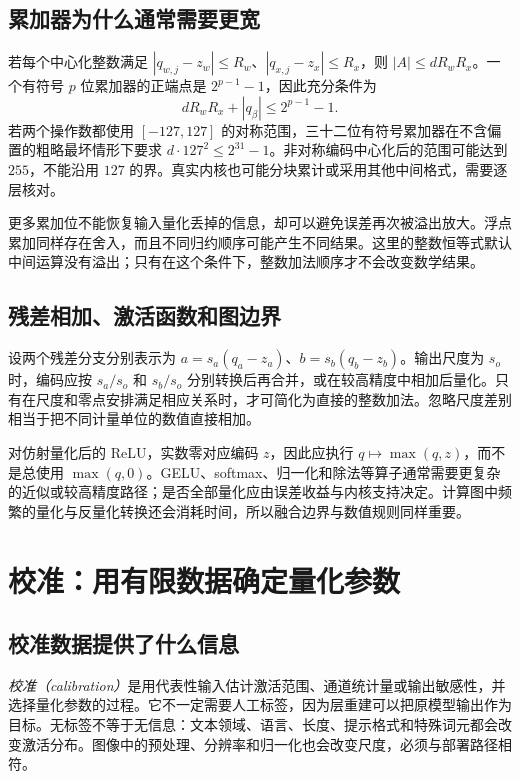 \documentclass[UTF8,12pt,a4paper,fontset=fandol]{ctexart}
\begin{document}
\subsection{累加器为什么通常需要更宽}
若每个中心化整数满足 $|q_{w,j}-z_w|\leq R_w$、$|q_{x,j}-z_x|\leq R_x$，则 $|A|\leq dR_wR_x$。一个有符号 $p$ 位累加器的正端点是 $2^{p-1}-1$，因此充分条件为
\begin{equation}
 dR_wR_x+|q_\beta|\leq2^{p-1}-1.
 \label{eq:quant-overflow}
\end{equation}
若两个操作数都使用 $[-127,127]$ 的对称范围，三十二位有符号累加器在不含偏置的粗略最坏情形下要求 $d\cdot127^2\leq2^{31}-1$。非对称编码中心化后的范围可能达到 $255$，不能沿用 $127$ 的界。真实内核也可能分块累计或采用其他中间格式，需要逐层核对。

更多累加位不能恢复输入量化丢掉的信息，却可以避免误差再次被溢出放大。浮点累加同样存在舍入，而且不同归约顺序可能产生不同结果。这里的整数恒等式默认中间运算没有溢出；只有在这个条件下，整数加法顺序才不会改变数学结果。

\subsection{残差相加、激活函数和图边界}
设两个残差分支分别表示为 $a=s_a(q_a-z_a)$、$b=s_b(q_b-z_b)$。输出尺度为 $s_o$ 时，编码应按 $s_a/s_o$ 和 $s_b/s_o$ 分别转换后再合并，或在较高精度中相加后量化。只有在尺度和零点安排满足相应关系时，才可简化为直接的整数加法。忽略尺度差别相当于把不同计量单位的数值直接相加。

对仿射量化后的 ReLU，实数零对应编码 $z$，因此应执行 $q\mapsto\max(q,z)$，而不是总使用 $\max(q,0)$。GELU、softmax、归一化和除法等算子通常需要更复杂的近似或较高精度路径；是否全部量化应由误差收益与内核支持决定。计算图中频繁的量化与反量化转换还会消耗时间，所以融合边界与数值规则同样重要。

\section{校准：用有限数据确定量化参数}
\label{sec:quant-calibration}

\subsection{校准数据提供了什么信息}
\emph{校准（calibration）}是用代表性输入估计激活范围、通道统计量或输出敏感性，并选择量化参数的过程。它不一定需要人工标签，因为层重建可以把原模型输出作为目标。无标签不等于无信息：文本领域、语言、长度、提示格式和特殊词元都会改变激活分布。图像中的预处理、分辨率和归一化也会改变尺度，必须与部署路径相符。
\end{document}
